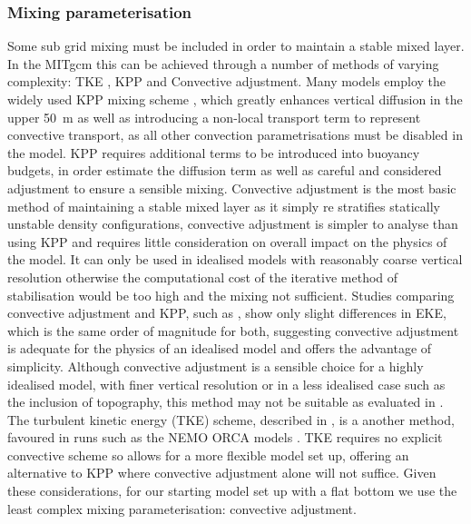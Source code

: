 \subsubsection*{Mixing parameterisation}

Some sub grid mixing must be included in order to maintain a stable mixed layer. In the MITgcm this can be achieved through a number of methods of varying complexity: \gls{TKE} , \gls{KPP} and Convective adjustment. 
Many models employ the widely used KPP mixing scheme \citep{large1994},  which greatly enhances vertical diffusion in the upper 50~m as well as introducing a non-local transport term to represent convective transport, as all other convection parametrisations must be disabled in the model. KPP requires additional terms to be introduced into buoyancy budgets, in order estimate the diffusion term as well as careful and considered adjustment to ensure a sensible mixing.  
Convective adjustment \citep{cox1984} is the most basic method of maintaining a stable mixed layer as it simply re stratifies statically unstable density configurations, convective adjustment is simpler to analyse than using KPP and requires little consideration on overall impact on the physics of the model. It can only be used in idealised models with reasonably coarse vertical resolution otherwise the computational cost of the iterative method of stabilisation would be too high and the mixing not sufficient. Studies comparing convective adjustment and KPP, such as \cite{Boccaletti2007b}, show only slight differences in EKE, which is the same order of magnitude for both, suggesting convective adjustment is adequate for the physics of an idealised model and offers the advantage of simplicity. Although convective adjustment is a sensible choice for a highly idealised model, with finer vertical resolution or in a less idealised case such as the inclusion of topography, this method may not be suitable as evaluated in \cite{griffies2000}. The turbulent kinetic energy (TKE) scheme, described in \cite{Gaspar1990,Madec1998}, is a another method, favoured in runs such as the NEMO ORCA models \citep{Kazantsev2013}. TKE requires no explicit convective scheme so allows for a more flexible model set up, offering an alternative to KPP where convective adjustment alone will not suffice.
Given these considerations, for our starting model set up with a flat bottom we use the least complex mixing parameterisation: convective adjustment. 


